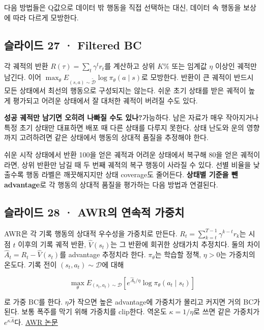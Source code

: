 \documentclass[11pt,a4paper]{article}
\begin{document}
다음 방법들은 Q값으로 데이터 밖 행동을 직접 선택하는 대신, 데이터 속 행동을 보상에 따라 다르게 모방한다.\par

\subsection{슬라이드 27 · Filtered BC}

각 궤적의 반환 $R(\tau)=\sum_t\gamma^t r_t$를 계산하고 상위 $K\%$ 또는 임계값 $\eta$ 이상인 궤적만 남긴다. 이어 $\max_\theta E_{(s,a)\sim\widetilde{\mathcal D}}\log\pi_\theta(a\mid s)$로 모방한다. 반환이 큰 궤적이 반드시 모든 상태에서 최선의 행동으로 구성되지는 않는다. 쉬운 초기 상태를 받은 궤적이 높게 평가되고 어려운 상태에서 잘 대처한 궤적이 버려질 수도 있다.\par

\par\medskip\noindent\textbf{성공 궤적만 남기면 오히려 나빠질 수도 있나?}\quad 가능하다. 남은 자료가 매우 작아지거나 특정 초기 상태만 대표하면 배포 때 다른 상태를 다루지 못한다. 상태 난도와 운의 영향까지 고려하려면 같은 상태에서 행동의 상대적 품질을 추정해야 한다.\par

쉬운 시작 상태에서 반환 100을 얻은 궤적과 어려운 상태에서 복구해 80을 얻은 궤적이라면, 상위 반환만 남길 때 두 번째 궤적의 복구 행동이 사라질 수 있다. 선별 비율을 낮출수록 행동 라벨은 깨끗해지지만 상태 coverage도 줄어든다. \textbf{상태별 기준을 뺀 advantage}로 각 행동의 상대적 품질을 평가하는 다음 방법과 연결된다.\par

\subsection{슬라이드 28 · AWR의 연속적 가중치}

AWR은 각 기록 행동의 상대적 우수성을 가중치로 만든다. $R_t=\sum_{k=t}^{T-1}\gamma^{k-t}r_k$는 시점 $t$ 이후의 기록 궤적 반환, $\widehat V(s_t)$는 그 반환에 회귀한 상태가치 추정치다. 둘의 차이 $\widehat A_t=R_t-\widehat V(s_t)$를 advantage 추정치라 한다. $\pi_\theta$는 학습할 정책, $\eta>0$는 가중치의 온도다. 기록 전이 $(s_t,a_t)\sim\mathcal D$에 대해\par

\[
\max_\theta E_{(s_t,a_t)\sim\mathcal D}
\left[e^{\widehat A_t/\eta}\log\pi_\theta(a_t\mid s_t)\right]
\]

로 가중 BC를 한다. $\eta$가 작으면 높은 advantage에 가중치가 몰리고 커지면 거의 BC가 된다. 보통 폭주를 막기 위해 가중치를 clip한다. 역온도 $\kappa=1/\eta$로 쓰면 같은 가중치가 $e^{\kappa\widehat A}$다. \href{https://arxiv.org/abs/1910.00177}{AWR 논문}\par
\end{document}
